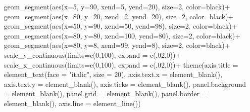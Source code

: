 \documentclass[
  letterpaper,
  DIV=11,
  numbers=noendperiod]{scrreprt}
\newenvironment{Shaded}{\begin{snugshade}}{\end{snugshade}}
\newcommand{\AttributeTok}[1]{\textcolor[rgb]{0.40,0.45,0.13}{#1}}
\newcommand{\DecValTok}[1]{\textcolor[rgb]{0.68,0.00,0.00}{#1}}
\newcommand{\FunctionTok}[1]{\textcolor[rgb]{0.28,0.35,0.67}{#1}}
\newcommand{\NormalTok}[1]{\textcolor[rgb]{0.00,0.23,0.31}{#1}}
\newcommand{\SpecialCharTok}[1]{\textcolor[rgb]{0.37,0.37,0.37}{#1}}
\newcommand{\StringTok}[1]{\textcolor[rgb]{0.13,0.47,0.30}{#1}}
\begin{document}
\begin{Shaded}
\begin{Highlighting}[]
  \FunctionTok{geom\_segment}\NormalTok{(}\FunctionTok{aes}\NormalTok{(}\AttributeTok{x=}\DecValTok{5}\NormalTok{, }\AttributeTok{y=}\DecValTok{90}\NormalTok{, }\AttributeTok{xend=}\DecValTok{5}\NormalTok{, }\AttributeTok{yend=}\DecValTok{20}\NormalTok{), }\AttributeTok{size=}\DecValTok{2}\NormalTok{, }\AttributeTok{color=}\NormalTok{black)}\SpecialCharTok{+}
  \FunctionTok{geom\_segment}\NormalTok{(}\FunctionTok{aes}\NormalTok{(}\AttributeTok{x=}\DecValTok{80}\NormalTok{, }\AttributeTok{y=}\DecValTok{20}\NormalTok{, }\AttributeTok{xend=}\DecValTok{2}\NormalTok{, }\AttributeTok{yend=}\DecValTok{20}\NormalTok{), }\AttributeTok{size=}\DecValTok{2}\NormalTok{, }\AttributeTok{color=}\NormalTok{black)}\SpecialCharTok{+}
  \FunctionTok{geom\_segment}\NormalTok{(}\FunctionTok{aes}\NormalTok{(}\AttributeTok{x=}\DecValTok{50}\NormalTok{, }\AttributeTok{y=}\DecValTok{90}\NormalTok{, }\AttributeTok{xend=}\DecValTok{50}\NormalTok{, }\AttributeTok{yend=}\DecValTok{98}\NormalTok{), }\AttributeTok{size=}\DecValTok{2}\NormalTok{, }\AttributeTok{color=}\NormalTok{black)}\SpecialCharTok{+}
  \FunctionTok{geom\_segment}\NormalTok{(}\FunctionTok{aes}\NormalTok{(}\AttributeTok{x=}\DecValTok{80}\NormalTok{, }\AttributeTok{y=}\DecValTok{80}\NormalTok{, }\AttributeTok{xend=}\DecValTok{100}\NormalTok{, }\AttributeTok{yend=}\DecValTok{80}\NormalTok{), }\AttributeTok{size=}\DecValTok{2}\NormalTok{, }\AttributeTok{color=}\NormalTok{black)}\SpecialCharTok{+}
  \FunctionTok{geom\_segment}\NormalTok{(}\FunctionTok{aes}\NormalTok{(}\AttributeTok{x=}\DecValTok{80}\NormalTok{, }\AttributeTok{y=}\DecValTok{8}\NormalTok{, }\AttributeTok{xend=}\DecValTok{99}\NormalTok{, }\AttributeTok{yend=}\DecValTok{8}\NormalTok{), }\AttributeTok{size=}\DecValTok{2}\NormalTok{, }\AttributeTok{color=}\NormalTok{black)}\SpecialCharTok{+}
  \FunctionTok{scale\_y\_continuous}\NormalTok{(}\AttributeTok{limits=}\FunctionTok{c}\NormalTok{(}\DecValTok{0}\NormalTok{,}\DecValTok{100}\NormalTok{), }\AttributeTok{expand =} \FunctionTok{c}\NormalTok{(.}\DecValTok{02}\NormalTok{,}\DecValTok{0}\NormalTok{))}\SpecialCharTok{+}
  \FunctionTok{scale\_x\_continuous}\NormalTok{(}\AttributeTok{limits=}\FunctionTok{c}\NormalTok{(}\DecValTok{0}\NormalTok{,}\DecValTok{100}\NormalTok{), }\AttributeTok{expand =} \FunctionTok{c}\NormalTok{(.}\DecValTok{02}\NormalTok{,}\DecValTok{0}\NormalTok{))}\SpecialCharTok{+}
  \FunctionTok{theme}\NormalTok{(}\AttributeTok{axis.title =} \FunctionTok{element\_text}\NormalTok{(}\AttributeTok{face =} \StringTok{"italic"}\NormalTok{, }\AttributeTok{size =} \DecValTok{20}\NormalTok{),}
        \AttributeTok{axis.text.x =} \FunctionTok{element\_blank}\NormalTok{(),}
        \AttributeTok{axis.text.y =} \FunctionTok{element\_blank}\NormalTok{(),}
        \AttributeTok{axis.ticks =} \FunctionTok{element\_blank}\NormalTok{(),}
        \AttributeTok{panel.background =} \FunctionTok{element\_blank}\NormalTok{(),}
        \AttributeTok{panel.grid =} \FunctionTok{element\_blank}\NormalTok{(),}
        \AttributeTok{panel.border =} \FunctionTok{element\_blank}\NormalTok{(),}
        \AttributeTok{axis.line =} \FunctionTok{element\_line}\NormalTok{())}
\end{Highlighting}
\end{Shaded}
\end{document}
